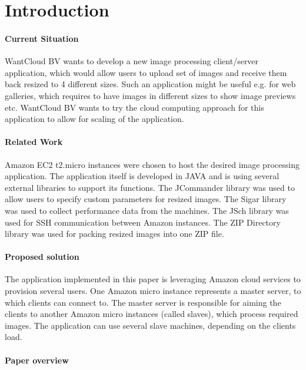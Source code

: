 \section{Introduction}
\paragraph{Current Situation} 
WantCloud BV wants to develop a new image processing client/server application, which would allow users to upload set of images and receive them back resized to 4 different sizes. Such an application might be useful e.g. for web galleries, which requires to have images in different sizes to show image previews etc. WantCloud BV wants to try the cloud computing approach for this application to allow for scaling of the application.

\paragraph{Related Work} 
Amazon EC2 t2.micro instances were chosen to host the desired image processing application. The application itself is developed in JAVA and is using several external libraries to support its functions. The JCommander library was used to allow users to specify custom parameters for resized images. The Sigar library was used to collect performance data from the machines. The JSch library was used for SSH communication between Amazon instances. The ZIP Directory library was used for packing resized images into one ZIP file.

\paragraph{Proposed solution}
The application implemented in this paper is leveraging Amazon cloud services to provision several users. One Amazon micro instance represents a master server, to which clients can connect to. The master server is responsible for aiming the clients to another Amazon micro instances (called slaves), which process required images. The application can use several slave machines, depending on the clients load.

\paragraph{Paper overview}
